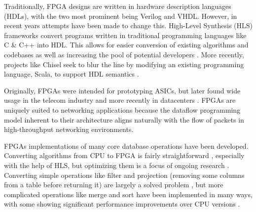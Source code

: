 Traditionally, FPGA designs are written in hardware description languages
(HDLs), with the two most prominent being Verilog and VHDL. However, in recent
years attempts have been made to change this. High-Level Synthesis (HLS)
frameworks convert programs written in traditional programming languages like C
\& C++ into HDL. This allows for easier conversion of existing algorithms and
codebases as well as increasing the pool of potential developers
\autocite{martin-destest-2009}. More recently, projects like Chisel seek to blur
the line by modifying an existing programming language, Scala, to support HDL
semantics \autocite{chisel}.

Originally, FPGAs were intended for prototyping ASICs, but later found wide
usage in the telecom industry \autocite{bobda-trets-2022,mencer-queue-2020} and
more recently in datacenters \autocite{mencer-queue-2020,hoozemans-cas-2021}.
FPGAs are uniquely suited to networking applications because the dataflow
programming model \autocite{hoozemans-cas-2021} inherent to their architecture
aligns naturally with the flow of packets in high-throughput networking
environments.

FPGAs implementations of many core database operations have been developed.
Converting algorithms from CPU to FPGA is fairly straightforward
\autocite{fang-vldb-2020}, especially with the help of HLS, but optimizing them
is a focus of ongoing research \autocite{fang-vldb-2020}. Converting simple
operations like filter and projection (removing some columns from a table before
returning it) are largely a solved problem \autocite{fang-vldb-2020}, but more
complicated operations like merge and sort have been implemented in many ways,
with some showing significant performance improvements over CPU versions
\autocite{leggett-trets-2025,moghaddamfar-damon-2021}.
